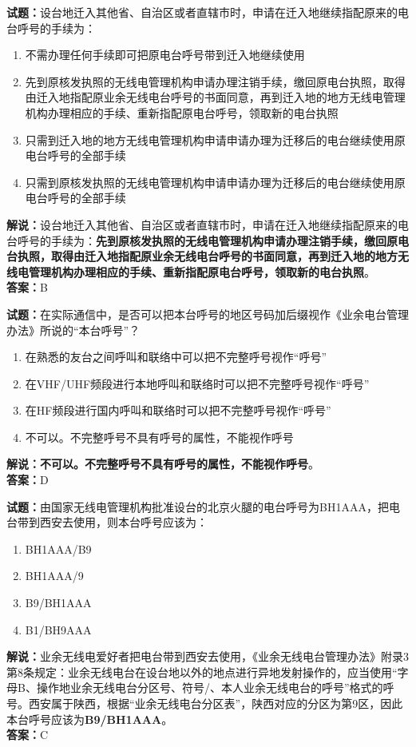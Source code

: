 \documentclass{ctexbook}
\begin{document}
\noindent\textbf{试题：}设台地迁入其他省、自治区或者直辖市时，申请在迁入地继续指配原来的电台呼号的手续为：
\begin{enumerate}[leftmargin=3em]
  \item 不需办理任何手续即可把原电台呼号带到迁入地继续使用
  \item 先到原核发执照的无线电管理机构申请办理注销手续，缴回原电台执照，取得由迁入地指配原业余无线电台呼号的书面同意，再到迁入地的地方无线电管理机构办理相应的手续、重新指配原电台呼号，领取新的电台执照
  \item 只需到迁入地的地方无线电管理机构申请申请办理为迁移后的电台继续使用原电台呼号的全部手续
  \item 只需到原核发执照的无线电管理机构申请申请办理为迁移后的电台继续使用原电台呼号的全部手续
\end{enumerate}
\noindent\textbf{解说：}设台地迁入其他省、自治区或者直辖市时，申请在迁入地继续指配原来的电台呼号的手续为：\textbf{先到原核发执照的无线电管理机构申请办理注销手续，缴回原电台执照，取得由迁入地指配原业余无线电台呼号的书面同意，再到迁入地的地方无线电管理机构办理相应的手续、重新指配原电台呼号，领取新的电台执照}。\\\noindent\textbf{答案：}B

\bigskip

\noindent\textbf{试题：}在实际通信中，是否可以把本台呼号的地区号码加后缀视作《业余电台管理办法》所说的“本台呼号”？
\begin{enumerate}[leftmargin=3em]
  \item 在熟悉的友台之间呼叫和联络中可以把不完整呼号视作“呼号”
  \item 在VHF/UHF频段进行本地呼叫和联络时可以把不完整呼号视作“呼号”
  \item 在HF频段进行国内呼叫和联络时可以把不完整呼号视作“呼号”
  \item 不可以。不完整呼号不具有呼号的属性，不能视作呼号
\end{enumerate}
\textbf{解说：不可以。不完整呼号不具有呼号的属性，不能视作呼号}。\\\noindent\textbf{答案：}D

\bigskip

\noindent\textbf{试题：}由国家无线电管理机构批准设台的北京火腿的电台呼号为BH1AAA，把电台带到西安去使用，则本台呼号应该为：
\begin{enumerate}[leftmargin=3em]
  \item BH1AAA/B9
  \item BH1AAA/9
  \item B9/BH1AAA
  \item B1/BH9AAA
\end{enumerate}
\noindent\textbf{解说：}业余无线电爱好者把电台带到西安去使用，《业余无线电台管理办法》附录3第8条规定：业余无线电台在设台地以外的地点进行异地发射操作的，应当使用“字母B、操作地业余无线电台分区号、符号/、本人业余无线电台的呼号”格式的呼号。西安属于陕西，根据“业余无线电台分区表”，陕西对应的分区为第9区，因此本台呼号应该为\textbf{B9/BH1AAA}。\\\noindent\textbf{答案：}C
\end{document}
